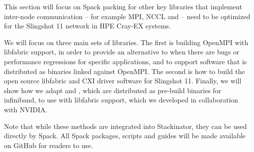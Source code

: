 
This section will focus on Spack packing for other key libraries that implement inter-node communication -- for example MPI, NCCL and \nvshmem -- need to be optimized for the Slingshot 11 network in HPE Cray-EX systems.

We will focus on three main sets of libraries. The first is building OpenMPI with libfabric support, in order to provide an alternative to \craympich when there are bugs or performance regressions for specific applications, and to support software that is distributed as binaries linked against OpenMPI. The second is how to build the open source libfabric and CXI driver software for Slingshot 11. Finally, we will show how we adapt \cufftmp and \cusolvermp, which are distributed as pre-build binaries for infiniband, to use \nvshmem with libfabric support, which we developed in collaboration with NVIDIA.

Note that while these methods are integrated into Stackinator, they can be used directly by Spack. All Spack packages, scripts and guides will be made available on GitHub for readers to use.
